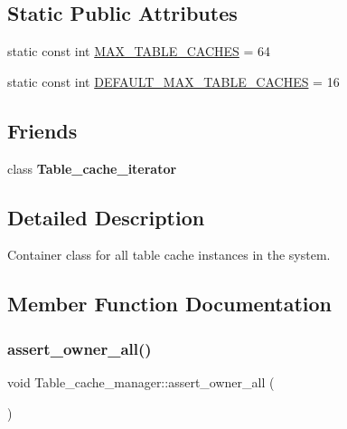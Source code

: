 \subsection*{Static Public Attributes}
\begin{DoxyCompactItemize}
\item 
static const int \mbox{\hyperlink{classTable__cache__manager_aa581393c5c20169a39b39d9bf3085390}{M\+A\+X\+\_\+\+T\+A\+B\+L\+E\+\_\+\+C\+A\+C\+H\+ES}} = 64
\item 
static const int \mbox{\hyperlink{classTable__cache__manager_ab740436c67b8ae28cbcf0f9cb3d50b47}{D\+E\+F\+A\+U\+L\+T\+\_\+\+M\+A\+X\+\_\+\+T\+A\+B\+L\+E\+\_\+\+C\+A\+C\+H\+ES}} = 16
\end{DoxyCompactItemize}
\subsection*{Friends}
\begin{DoxyCompactItemize}
\item 
\mbox{\label{classTable__cache__manager_a08fcc4e2cad8dc13a757eb4180d2edf0}} 
class {\bfseries Table\+\_\+cache\+\_\+iterator}
\end{DoxyCompactItemize}


\subsection{Detailed Description}
Container class for all table cache instances in the system. 

\subsection{Member Function Documentation}
\mbox{\label{classTable__cache__manager_a76f632068e35751f33f55411782ec0f5}} 
\subsubsection{\texorpdfstring{assert\+\_\+owner\+\_\+all()}{assert\_owner\_all()}}
{\footnotesize\ttfamily void Table\+\_\+cache\+\_\+manager\+::assert\+\_\+owner\+\_\+all (\begin{DoxyParamCaption}{ }\end{DoxyParamCaption})}

